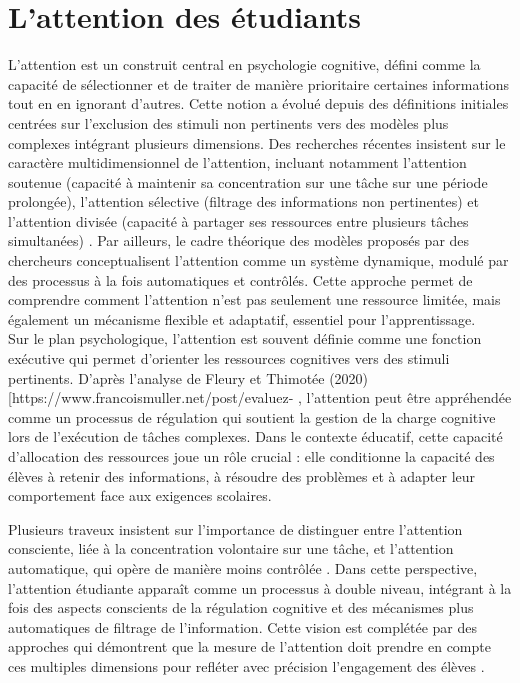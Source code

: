 \section{L'attention des étudiants}
L'attention est un construit central en psychologie cognitive, défini comme la capacité de sélectionner et de traiter de manière prioritaire certaines informations tout en en ignorant d'autres. Cette notion a évolué depuis des définitions initiales centrées sur l'exclusion des stimuli non pertinents vers des modèles plus complexes intégrant plusieurs dimensions. Des recherches récentes insistent sur le caractère multidimensionnel de l'attention, incluant notamment l'attention soutenue (capacité à maintenir sa concentration sur une tâche sur une période prolongée), l'attention sélective (filtrage des informations non pertinentes) et l'attention divisée (capacité à partager ses ressources entre plusieurs tâches simultanées) \cite{ELBAZINI}.
Par ailleurs, le cadre théorique des modèles proposés par des chercheurs conceptualisent l'attention comme un système dynamique, modulé par des processus à la fois automatiques et contrôlés. Cette approche permet de comprendre comment l'attention n'est pas seulement une ressource limitée, mais également un mécanisme flexible et adaptatif, essentiel pour l'apprentissage. \cite{Pinelli_Portrat_2023} \\
Sur le plan psychologique, l'attention est souvent définie comme une fonction exécutive qui permet d'orienter les ressources cognitives vers des stimuli pertinents. D'après l'analyse de Fleury et Thimotée (2020) [https://www.francoismuller.net/post/evaluez-%
, l'attention peut être appréhendée comme un processus de régulation qui soutient la gestion de la charge cognitive lors de l'exécution de tâches complexes. Dans le contexte éducatif, cette capacité d'allocation des ressources joue un rôle crucial : elle conditionne la capacité des élèves à retenir des informations, à résoudre des problèmes et à adapter leur comportement face aux exigences scolaires.

Plusieurs traveux insistent sur l'importance de distinguer entre l'attention consciente, liée à la concentration volontaire sur une tâche, et l'attention automatique, qui opère de manière moins contrôlée \cite{Chesné_Piedfer}. Dans cette perspective, l'attention étudiante apparaît comme un processus à double niveau, intégrant à la fois des aspects conscients de la régulation cognitive et des mécanismes plus automatiques de filtrage de l'information. Cette vision est complétée par des approches qui démontrent que la mesure de l'attention doit prendre en compte ces multiples dimensions pour refléter avec précision l'engagement des élèves \cite{Ufapec_van}. 

